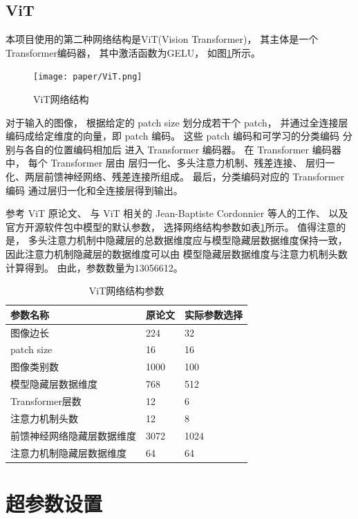 \documentclass[12pt]{article}
\begin{document}
\subsection{ViT}

本项目使用的第二种网络结构是ViT(Vision Transformer)，
其主体是一个Transformer编码器，
其中激活函数为GELU，
如图\ref{fig:ViT}所示。

\begin{figure}[h]
	\texttt{[image: paper/ViT.png]}
	\caption{ViT网络结构}
	\label{fig:ViT}
\end{figure}

对于输入的图像，
根据给定的 patch size 划分成若干个 patch，
并通过全连接层编码成给定维度的向量，即 patch 编码。
这些 patch 编码和可学习的分类编码
分别与各自的位置编码相加后
进入 Transformer 编码器。
在 Transformer 编码器中，
每个 Transformer 层由
层归一化、多头注意力机制、残差连接、
层归一化、两层前馈神经网络、残差连接所组成。
最后，分类编码对应的 Transformer 编码
通过层归一化和全连接层得到输出。

参考 ViT 原论文、
与 ViT 相关的 Jean-Baptiste Cordonnier 等人的工作、
以及官方开源软件包中模型的默认参数，
选择网络结构参数如表\ref{tab:Transformer}所示。
值得注意的是，
多头注意力机制中隐藏层的总数据维度应与模型隐藏层数据维度保持一致，
因此注意力机制隐藏层的数据维度可以由
模型隐藏层数据维度与注意力机制头数计算得到。
由此，参数数量为13056612。

\begin{table}[h]
	\centering
	\begin{tabular}{lll} 
		\hline
		参数名称 & 原论文 & 实际参数选择 \\
		\hline
		图像边长 & 224 & 32 \\
		patch size & 16 & 16 \\
		图像类别数 & 1000 & 100 \\
		模型隐藏层数据维度 & 768 & 512 \\
		Transformer层数 & 12 & 6 \\
		注意力机制头数 & 12 & 8 \\ 
		前馈神经网络隐藏层数据维度 & 3072 & 1024 \\	
		注意力机制隐藏层数据维度 & 64 & 64 \\
		\hline
	\end{tabular}
	\caption{ViT网络结构参数}
	\label{tab:Transformer}
\end{table}

\section{超参数设置}
\end{document}
